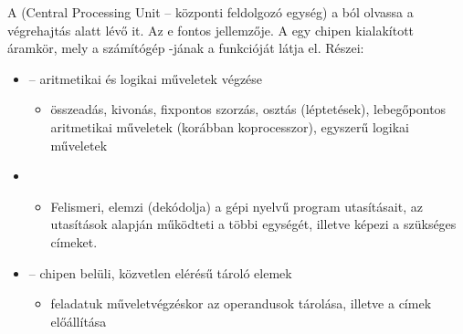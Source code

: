 \documentclass[main.tex]{subfiles}
\begin{document}
  A  (Central Processing Unit – központi feldolgozó egység)
  a ból olvassa a végrehajtás alatt lévő
  it.
  Az e fontos jellemzője.
  A  egy chipen kialakított áramkör,
  mely a számítógép -jának a funkcióját látja el.
  Részei:
  \begin{itemize}
    \item {} – aritmetikai és logikai műveletek végzése
    \begin{itemize}
      \item összeadás, kivonás,
      fixpontos szorzás, osztás (léptetések),
      lebegőpontos aritmetikai műveletek (korábban koprocesszor),
      egyszerű logikai műveletek
    \end{itemize}

    \item {}
    \begin{itemize}
      \item Felismeri, elemzi (dekódolja) a gépi nyelvű
      program utasításait, az utasítások alapján működteti
      a  többi egységét, illetve képezi a szükséges címeket.
    \end{itemize}

    \item {} –
    chipen belüli, közvetlen elérésű tároló elemek
    \begin{itemize}
      \item feladatuk műveletvégzéskor az operandusok tárolása,
      illetve a címek előállítása
    \end{itemize}
  \end{itemize}
\end{document}
